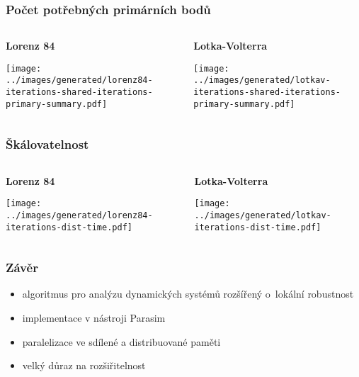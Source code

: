 \documentclass[xcolor=svgnames]{beamer}
\begin{document}
\begin{frame}
	\frametitle{Počet potřebných primárních bodů}

	\begin{columns}[2]
		\begin{column}{0.5\textwidth}
			\begin{center}
				\textbf{Lorenz 84}

				\texttt{[image: ../images/generated/lorenz84-iterations-shared-iterations-primary-summary.pdf]}
			\end{center}
		\end{column}
		\begin{column}{0.5\textwidth}
			\begin{center}
				\textbf{Lotka-Volterra}

				\texttt{[image: ../images/generated/lotkav-iterations-shared-iterations-primary-summary.pdf]}
			\end{center}
		\end{column}
	\end{columns}
\end{frame}
\begin{frame}
	\frametitle{Škálovatelnost}

	\begin{columns}[2]
		\begin{column}{0.5\textwidth}
			\begin{center}
				\textbf{Lorenz 84}

				\texttt{[image: ../images/generated/lorenz84-iterations-dist-time.pdf]}
			\end{center}
		\end{column}
		\begin{column}{0.5\textwidth}
			\begin{center}
				\textbf{Lotka-Volterra}

				\texttt{[image: ../images/generated/lotkav-iterations-dist-time.pdf]}
			\end{center}
		\end{column}
	\end{columns}
\end{frame}
\begin{frame}
	\frametitle{Závěr}
	\begin{itemize}
		\item	algoritmus pro analýzu dynamických systémů rozšířený o~lokální robustnost
		\item	implementace v nástroji Parasim
		\item	paralelizace ve sdílené a distribuované paměti
		\item	velký důraz na rozšiřitelnost
	\end{itemize}
\end{frame}
\end{document}
